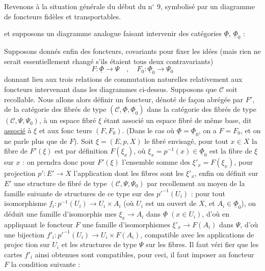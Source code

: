 Revenons à la situation générale du début du n$^\circ$ 9, symbolisé par un
diagramme de foncteurs fidèles et transportables.


et supposons un diagramme analogue faisant intervenir des catégories
$\underline{\Phi}$, $\underline{\Phi}_0$ :


\newpage



Supposons donnés enfin des foncteurs, covariants pour fixer les idées
(mais rien ne serait essentiellement changé s'ils étaient tous deux
contravariants)
\[ F : \underline{\Phi} \to \Psi \quad , \quad F_0 : \underline{\Phi}_0 \to \Psi_0 \]
donnant lieu aux trois relations de commutation naturelles relativement
aux foncteurs intervenant dans les diagrammes ci-dessus. Supposons que
$\mathcal{C}$ soit recollable. Nous allons alors définir un foncteur, dénoté de
façon abrégée par $F'$, de la catégorie des fibrés de type $(\mathcal{C}, \underline{\Phi}, \underline{\Phi}_0)$
dans la catégorie des fibrés de type $(\mathcal{C}, \Psi, \Psi_0)$, à un espace fibré $\xi$
étant associé un espace fibré de même base, dit \underline{associé} à $\xi$ et aux fonc
teurs $(F,F_0)$. (Dans le cas où $\underline{\Phi} = \underline{\Phi}_0$, on a $F = F_0$, et on ne parle plus
que de $F$). Soit $\xi = (E,p,X)$ le fibré envisagé, pour tout $x \in X$ la fibre
de $F'(\xi)$ est par définition $F(\xi_x)$, où $\xi_x = p^{-1}(x) \in \underline{\Phi}_0$ est la fibre de $\xi$
sur $x$ : on prendra donc pour $F'(\xi)$ l'ensemble somme des $\xi'_x = F(\xi_x)$,
pour projection $p' : E' \to X$ l'application dont les fibres sont les $\xi'_x$,
enfin on définit sur $E'$ une structure de fibré de type $(\mathcal{C}, \Psi, \Psi_0)$
par recollement au moyen de la famille suivante de structures de ce
type sur des $p'^{-1}(U_i)$ : pour tout isomorphisme $f_i : p^{-1}(U_i) \to U_i \times A_i$ (où
$U_i$ est un ouvert de $X$, et $A_i \in \underline{\Phi}_0$), on déduit une famille d'isomorphis
mes $\xi_x \to A_i$ dans $\underline{\Phi} \; (x \in U_i)$, d'où en appliquant le foncteur $F$ une
famille d'isomorphismes $\xi'_x \to F(A_i)$ dans $\Psi$, d'où une bijection
$f'_i : p'^{-1}(U_i) \to U_i \times F(A_i)$, compatible avec les applications de projec
tion sur $U_i$ et les structures de type $\Psi$ sur les fibres. Il faut véri
fier que les cartes $f'_i$ ainsi obtenues sont compatibles, pour ceci,
il faut imposer au foncteur $F$ la condition suivante :

